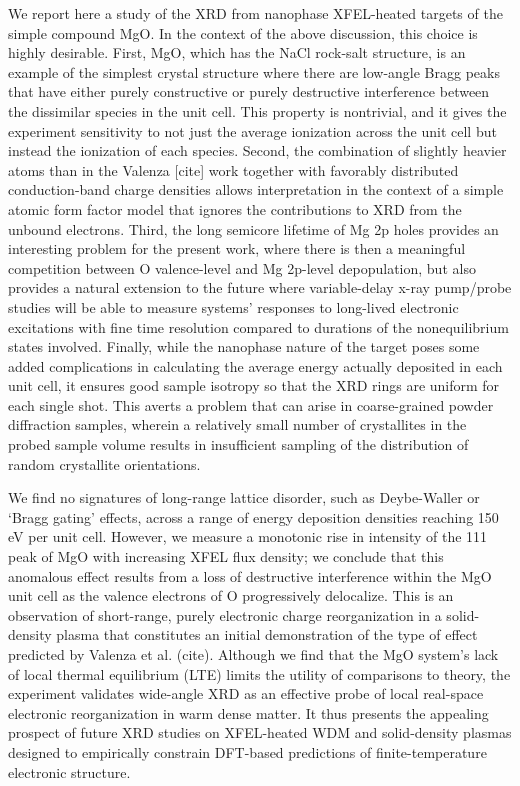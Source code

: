 We report here a study of the XRD from nanophase XFEL-heated targets of
the simple compound MgO. In the context of the above discussion, this
choice is highly desirable. First, MgO, which has the NaCl rock-salt
structure, is an example of the simplest crystal structure where there
are low-angle Bragg peaks that have either purely constructive or purely
destructive interference between the dissimilar species in the unit
cell. This property is nontrivial, and it gives the experiment
sensitivity to not just the average ionization across the unit cell but
instead the ionization of each species. Second, the combination of
slightly heavier atoms than in the Valenza {[}cite{]} work together with
favorably distributed conduction-band charge densities allows
interpretation in the context of a simple atomic form factor model that
ignores the contributions to XRD from the unbound electrons. Third, the
long semicore lifetime of Mg 2p holes provides an interesting problem
for the present work, where there is then a meaningful competition
between O valence-level and Mg 2p-level depopulation, but also provides
a natural extension to the future where variable-delay x-ray pump/probe
studies will be able to measure systems' responses to long-lived
electronic excitations with fine time resolution compared to durations
of the nonequilibrium states involved. Finally, while the nanophase
nature of the target poses some added complications in calculating the
average energy actually deposited in each unit cell, it ensures good
sample isotropy so that the XRD rings are uniform for each single shot.
This averts a problem that can arise in coarse-grained powder
diffraction samples, wherein a relatively small number of crystallites
in the probed sample volume results in insufficient sampling of the
distribution of random crystallite orientations.

We find no signatures of long-range lattice disorder, such as
Deybe-Waller or `Bragg gating' effects, across a range of energy
deposition densities reaching 150 eV per unit cell. However, we measure
a monotonic rise in intensity of the 111 peak of MgO with increasing
XFEL flux density; we conclude that this anomalous effect results from a
loss of destructive interference within the MgO unit cell as the valence
electrons of O progressively delocalize. This is an observation of
short-range, purely electronic charge reorganization in a solid-density
plasma that constitutes an initial demonstration of the type of effect
predicted by Valenza et al. (cite). Although we find that the MgO
system's lack of local thermal equilibrium (LTE) limits the utility of
comparisons to theory, the experiment validates wide-angle XRD as an
effective probe of local real-space electronic reorganization in warm
dense matter. It thus presents the appealing prospect of future XRD
studies on XFEL-heated WDM and solid-density plasmas designed to
empirically constrain DFT-based predictions of finite-temperature
electronic structure.

